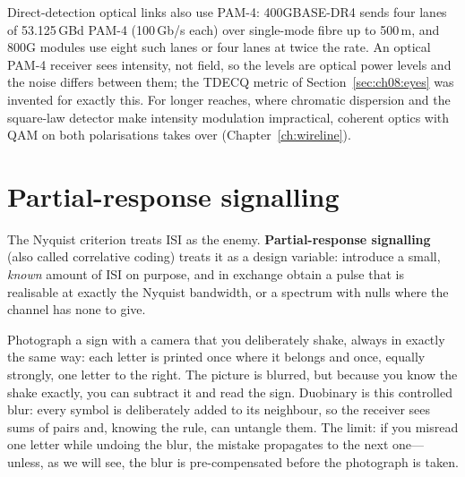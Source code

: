 \begin{inpractice}
Direct-detection optical links also use PAM-4: 400GBASE-DR4 sends four lanes of 53.125\,GBd
PAM-4 (100\,Gb/s each) over single-mode fibre up to 500\,m, and 800G modules use eight such
lanes or four lanes at twice the rate. An optical PAM-4 receiver sees intensity, not field, so
the levels are optical power levels and the noise differs between them; the TDECQ metric of
Section~\ref{sec:ch08:eyes} was invented for exactly this. For longer reaches, where chromatic
dispersion and the square-law detector make intensity modulation impractical, coherent optics
with QAM on both polarisations takes over (Chapter~\ref{ch:wireline}).
\end{inpractice}

\section{Partial-response signalling}
\label{sec:ch08:pr}

The Nyquist criterion treats ISI as the enemy. \textbf{Partial-response
signalling} (also called correlative coding) treats it as a
design variable: introduce a small, \emph{known} amount of ISI on purpose, and in exchange
obtain a pulse that is realisable at exactly the Nyquist bandwidth, or a spectrum with nulls
where the channel has none to give.

\begin{analogy}
Photograph a sign with a camera that you deliberately shake, always in exactly the same way:
each letter is printed once where it belongs and once, equally strongly, one letter to the
right. The picture is blurred, but because you know the shake exactly, you can subtract it
and read the sign. Duobinary is this controlled blur: every symbol is deliberately added to
its neighbour, so the receiver sees sums of pairs and, knowing the rule, can untangle them.
The limit: if you misread one letter while undoing the blur, the mistake propagates to the
next one---unless, as we will see, the blur is pre-compensated before the photograph is taken.
\end{analogy}


